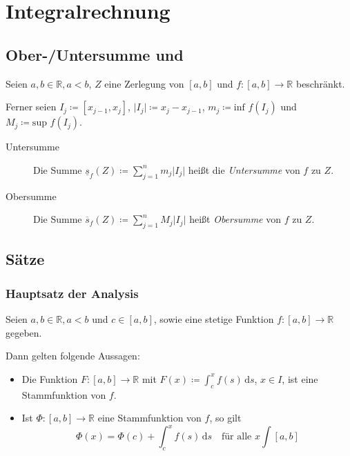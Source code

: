 \chapter{Integralrechnung}
    \section{Ober-/Untersumme und}
        Seien $ a, b \in \mathbb{R}, a < b $, $ Z $ eine Zerlegung von $ [a, b] $ und $ f : [a, b] \rightarrow \mathbb{R} $ beschränkt.

        Ferner seien $ I _ j \coloneqq [x _ { j - 1 }, x _ j] $, $ \lvert I _ j \rvert \coloneqq x _ j - x _ { j - 1 } $, $ m _ j \coloneqq \text{inf } f(I _ j) $ und $ M _ j \coloneqq \text{sup } f(I _ j) $.

        \begin{description}
            \item[Untersumme] Die Summe $ \underline{s} _ f (Z) \coloneqq \sum _ { j = 1 } ^ n m _ j \lvert I _ j \rvert $ heißt die \textit{Untersumme} von $ f $ zu $ Z $.
            \item[Obersumme] Die Summe $ \overline{s} _ f (Z) \coloneqq \sum _ { j = 1 } ^ n M _ j \lvert I _ j \rvert $ heißt \textit{Obersumme} von $ f $ zu $ Z $.
        \end{description}

    \section{Sätze}
        \subsection{Hauptsatz der Analysis}
            Seien $ a, b \in \mathbb{R}, a < b $ und $ c \in [a, b] $, sowie eine stetige Funktion $ f : [a, b] \rightarrow \mathbb{R} $ gegeben.

            Dann gelten folgende Aussagen:
            \begin{itemize}
                \item Die Funktion $ F : [a, b] \rightarrow \mathbb{R} $ mit $ F(x) \coloneqq \int _ c ^ x \! f(s) \, \mathrm{d}s $, $ x \in I $, ist eine Stammfunktion von $ f $.
                \item Ist $ \Phi : [a, b] \rightarrow \mathbb{R} $ eine Stammfunktion von $ f $, so gilt \[ \Phi(x) = \Phi(c) + \int _ c ^ x \! f(s) \, \mathrm{d}s \quad\text{für alle } x \int [a, b] \]
            \end{itemize}

